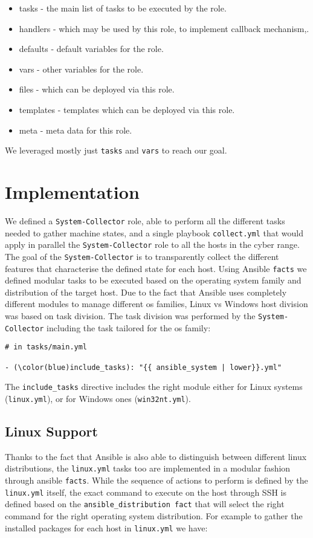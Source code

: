 \documentclass[11pt]{article}
\begin{document}
\begin{itemize}
\item tasks - the main list of tasks to be executed by the role.
\item handlers - which may be used by this role, to implement callback mechanism,.
\item defaults - default variables for the role.
\item vars - other variables for the role.
\item files - which can be deployed via this role.
\item templates - templates which can be deployed via this role.
\item meta - meta data for this role.
\end{itemize}

We leveraged mostly just {\tt tasks} and {\tt vars} to reach our goal. 

\section{Implementation}
We defined a {\tt System-Collector} role, able to perform all the different tasks needed to gather machine states, and a single playbook {\tt collect.yml} that would apply in parallel the {\tt System-Collector} role to all the hosts in the cyber range.  
The goal of the {\tt System-Collector} is to transparently collect the different features that characterise the defined state for each host. Using Ansible {\tt facts} we defined modular tasks to be executed based on the operating system family and distribution of the target host. Due to the fact that Ansible uses completely different modules to manage different os families, Linux vs Windows host division was based on task division. The task division was performed by the {\tt System-Collector} including the task tailored for the os family:

\begin{Verbatim}[commandchars=\\\(\)]
# in tasks/main.yml

- (\color(blue)include_tasks): "{{ ansible_system | lower}}.yml"
\end{Verbatim}

The {\tt include\_tasks} directive includes the right module either for Linux systems ({\tt linux.yml}), or for Windows ones ({\tt win32nt.yml}). 

\subsection{Linux Support}
Thanks to the fact that Ansible is also able to distinguish between different linux distributions, the {\tt linux.yml} tasks too are implemented in a modular fashion through ansible {\tt facts}. While the sequence of actions to perform is defined by the {\tt linux.yml} itself, the exact command to execute on the host through SSH is defined based on the {\tt ansible\_distribution fact} that will select the right command for the right operating system distribution. For example to gather the installed packages for each host in {\tt linux.yml} we have:
\end{document}
